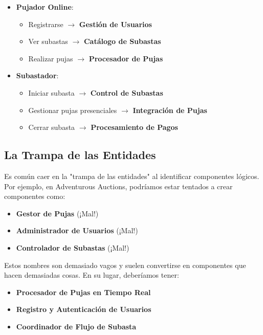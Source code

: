 \begin{itemize}
    \item \textbf{Pujador Online}:
        \begin{itemize}
            \item Registrarse \(\rightarrow\) \textbf{Gestión de Usuarios}
            \item Ver subastas \(\rightarrow\) \textbf{Catálogo de Subastas}
            \item Realizar pujas \(\rightarrow\) \textbf{Procesador de Pujas}
        \end{itemize}
    \item \textbf{Subastador}:
        \begin{itemize}
            \item Iniciar subasta \(\rightarrow\) \textbf{Control de Subastas}
            \item Gestionar pujas presenciales \(\rightarrow\) \textbf{Integración de Pujas}
            \item Cerrar subasta \(\rightarrow\) \textbf{Procesamiento de Pagos}
        \end{itemize}
\end{itemize}

\subsection{La Trampa de las Entidades}

Es común caer en la "trampa de las entidades" al identificar componentes lógicos. Por ejemplo, en Adventurous Auctions, podríamos estar tentados a crear componentes como:

\begin{itemize}
    \item \textbf{Gestor de Pujas} (¡Mal!)
    \item \textbf{Administrador de Usuarios} (¡Mal!)
    \item \textbf{Controlador de Subastas} (¡Mal!)
\end{itemize}

Estos nombres son demasiado vagos y suelen convertirse en componentes que hacen demasiadas cosas. En su lugar, deberíamos tener:

\begin{itemize}
    \item \textbf{Procesador de Pujas en Tiempo Real}
    \item \textbf{Registro y Autenticación de Usuarios}
    \item \textbf{Coordinador de Flujo de Subasta}
\end{itemize}

